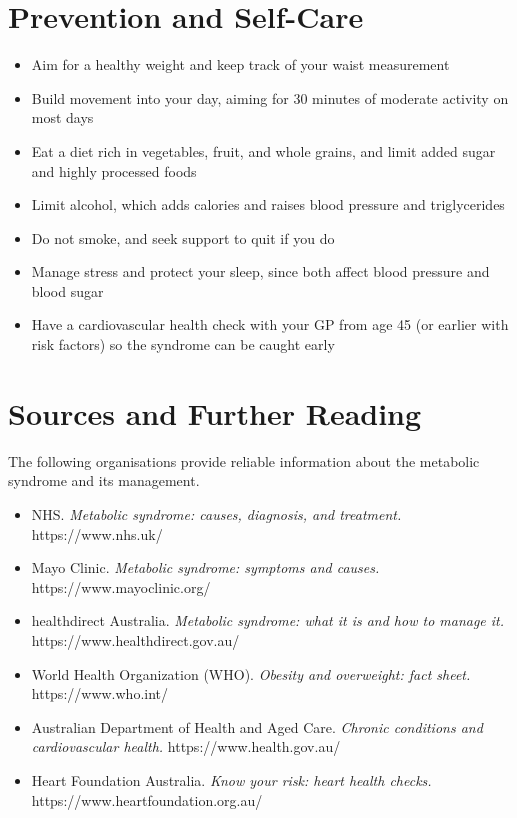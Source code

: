 \section*{Prevention and Self-Care}
\begin{itemize}
    \item Aim for a healthy weight and keep track of your waist measurement
    \item Build movement into your day, aiming for 30 minutes of moderate activity on most days
    \item Eat a diet rich in vegetables, fruit, and whole grains, and limit added sugar and highly processed foods
    \item Limit alcohol, which adds calories and raises blood pressure and triglycerides
    \item Do not smoke, and seek support to quit if you do
    \item Manage stress and protect your sleep, since both affect blood pressure and blood sugar
    \item Have a cardiovascular health check with your GP from age 45 (or earlier with risk factors) so the syndrome can be caught early
\end{itemize}

\section*{Sources and Further Reading}
The following organisations provide reliable information about the metabolic syndrome and its management.

\begin{itemize}
    \item NHS. \textit{Metabolic syndrome: causes, diagnosis, and treatment.} https://www.nhs.uk/
    \item Mayo Clinic. \textit{Metabolic syndrome: symptoms and causes.} https://www.mayoclinic.org/
    \item healthdirect Australia. \textit{Metabolic syndrome: what it is and how to manage it.} https://www.healthdirect.gov.au/
    \item World Health Organization (WHO). \textit{Obesity and overweight: fact sheet.} https://www.who.int/
    \item Australian Department of Health and Aged Care. \textit{Chronic conditions and cardiovascular health.} https://www.health.gov.au/
    \item Heart Foundation Australia. \textit{Know your risk: heart health checks.} https://www.heartfoundation.org.au/
\end{itemize}
\clearpage
